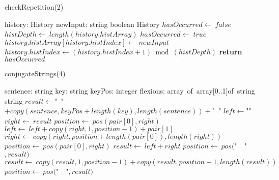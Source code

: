 \documentclass[a4paper,10pt]{article}
\begin{document}
\begin{algorithm}
\caption{checkRepetition(2)}
\begin{algorithmic}[5]
\State {}
\State {}
    \State history: History
    \State newInput: string
  \EndDecl
    \State boolean
  \EndDecl
    \State History
  \EndDecl
  \State \(hasOccurred\gets\ false\)
    \State \(histDepth\gets\ length(history.histArray)\)
        \State \(hasOccurred\gets\ true\)
      \EndIf
    \EndFor
    \State \(history.histArray[history.histIndex]\gets\ newInput\)
    \State \(history.histIndex\gets(history.histIndex+1)\bmod(histDepth)\)
  \EndIf
  \State \textbf{return} \(hasOccurred\)
\EndFunction
\end{algorithmic}
\end{algorithm}


\begin{algorithm}
\caption{conjugateStrings(4)}
\begin{algorithmic}[5]
    \State sentence: string
    \State key: string
    \State keyPos: integer
    \State flexions: array\ of\ array[0..1]of\ string
  \EndDecl
    \State string
  \EndDecl
  \State \(result\gets\)"{}\ "{}\(+copy(sentence,keyPos+length(key),length(sentence))+\)"{}\ "{}\(\)
    \State \(left\gets\)"{}"{}\(\)
    \State \(right\gets\ result\)
    \State \(position\gets\ pos(pair[0],right)\)
      \State \(left\gets\ left+copy(right,1,position-1)+pair[1]\)
      \State \(right\gets\ copy(right,position+length(pair[0]),length(right))\)
      \State \(position\gets\ pos(pair[0],right)\)
    \EndWhile
    \State \(result\gets\ left+right\)
  \EndFor
  \State \(position\gets\ pos(\)"{}\ \ "{}\(,result)\)
    \State \(result\gets\ copy(result,1,position-1)+copy(result,position+1,length(result))\)
    \State \(position\gets\ pos(\)"{}\ \ "{}\(,result)\)
  \EndWhile
\EndFunction
\end{algorithmic}
\end{algorithm}
\end{document}
